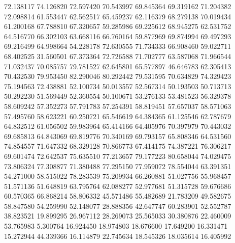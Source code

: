 72.138117
74.126820
72.597420
70.543997
69.845364
69.319162
71.204382
72.098814
61.553447
62.562517
65.459237
62.116379
68.279138
70.019434
61.200168
67.788810
67.320657
59.285986
69.225612
68.945275
62.531752
64.516770
66.302103
63.668116
66.760164
59.877969
69.874994
69.497293
69.216499
64.998664
54.228178
72.630555
71.734333
66.908460
59.022711
68.402525
31.560501
67.373364
72.726588
71.702777
63.587068
71.966544
71.032437
70.085757
79.781527
62.645801
65.577897
46.646783
62.305413
70.432530
79.953450
82.290046
80.292442
79.531595
70.634829
74.329423
75.194563
72.438881
52.100734
50.013557
52.567314
50.193503
50.713713
50.292230
51.569449
52.360554
50.100671
53.276133
53.481523
56.329378
58.609242
57.352273
57.791783
57.254391
58.819451
57.657037
58.571063
57.495760
58.623221
60.250721
65.546619
64.384365
61.125546
62.787679
64.832512
61.056502
59.983964
65.414166
64.405976
70.397979
70.443032
69.685813
64.843069
69.819776
70.340169
69.793157
65.808346
64.531560
74.854557
71.647332
68.329128
70.866773
67.414175
74.387221
76.306217
69.601474
72.642537
75.635510
77.213657
79.177223
80.658044
74.029475
73.806324
77.308877
71.380488
77.295150
77.959072
78.554044
63.391351
54.271000
58.515022
78.283539
75.209934
66.260881
51.027756
55.968457
51.571136
51.648819
63.795764
62.088277
52.977681
51.315728
59.676686
60.570365
66.868214
58.806332
45.571486
55.482689
21.783209
49.582675
58.847580
54.259990
52.148077
28.888356
42.647747
60.283901
52.552787
38.823521
19.899295
26.967112
28.269073
25.565033
30.380876
22.460009
53.765983
5.300764
16.924450
18.974803
18.676600
17.649200
16.331471
15.272944
44.339366
16.114879
22.745634
18.545326
18.035614
16.405992
